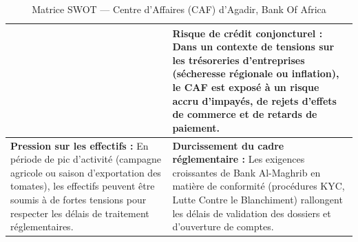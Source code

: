 \begin{table}[h!]
\begin{tabularx}{\textwidth}{|X|X|}
&
\textbf{Risque de crédit conjoncturel :} Dans un contexte de tensions sur les trésoreries d'entreprises (sécheresse régionale ou inflation), le CAF est exposé à un risque accru d'impayés, de rejets d'effets de commerce et de retards de paiement. \\
\hline
\textbf{Pression sur les effectifs :} En période de pic d'activité (campagne agricole ou saison d'exportation des tomates), les effectifs peuvent être soumis à de fortes tensions pour respecter les délais de traitement réglementaires.
&
\textbf{Durcissement du cadre réglementaire :} Les exigences croissantes de Bank Al-Maghrib en matière de conformité (procédures KYC, Lutte Contre le Blanchiment) rallongent les délais de validation des dossiers et d'ouverture de comptes. \\
\hline
\end{tabularx}
\caption{Matrice SWOT --- Centre d'Affaires (CAF) d'Agadir, Bank Of Africa}
\end{table}




